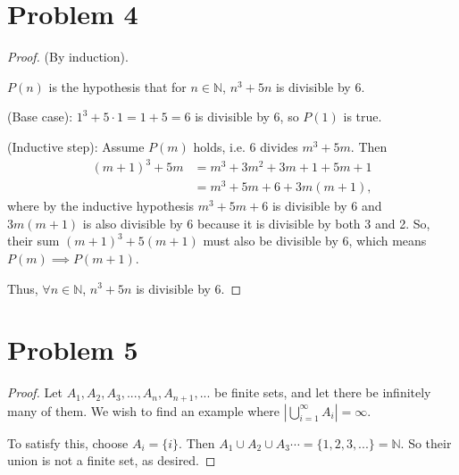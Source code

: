 \documentclass{article}
\begin{document}
\section*{Problem 4}
\begin{proof}
	(By induction). 
	
	$P(n)$ is the hypothesis that for $n\in\mathbb{N}$, $n^3 + 5n$ is divisible by $6$.
	
	(Base case): $1^3 + 5\cdot1 = 1 + 5 = 6$ is divisible by 6, so $P(1)$ is true. 
	
	(Inductive step): Assume $P(m)$ holds, i.e. 6 divides $m^3 + 5m$. Then
	\begin{align}
		(m+1)^3 + 5m &= m^3 + 3m^2 + 3m + 1 + 5m + 1 \\
		&= m^3 + 5m + 6 + 3m(m+1), 
	\end{align}
	where by the inductive hypothesis $m^3 +5m + 6$ is divisible by 6 and $3m(m+1)$ is also divisible by 6 because it is divisible by both 3 and 2. So, their sum $(m+1)^3 + 5(m+1)$ must also be divisible by 6, which means $P(m)\implies P(m+1)$.
	
	Thus, $\forall n\in\mathbb{N}$, $n^3 + 5n$ is divisible by 6. 
\end{proof}

\section*{Problem 5}
\begin{proof}
	Let $A_1, A_2, A_3, ..., A_n, A_{n+1}, ...$ be finite sets, and let there be infinitely many of them. We wish to find an example where $|\bigcup\limits_{i=1}^{\infty} A_i| = \infty$. 
	
	To satisfy this, choose $A_{i} = \{i\}$. Then $A_1 \cup A_2 \cup A_3 \cdots = \{1, 2, 3, ... \} = \mathbb{N}$. So their union is not a finite set, as desired. 
\end{proof}
\end{document}
